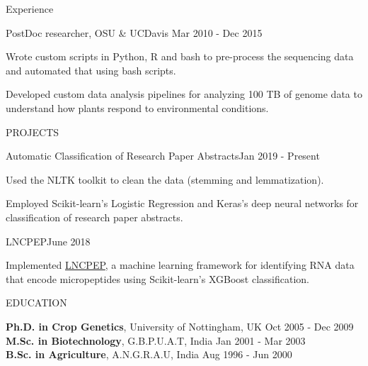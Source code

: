 \documentclass{resume} %
\begin{document}
\begin{rSection}{Experience }
\vspace{-4pt}

\begin{rSubsection}{PostDoc researcher, OSU \& UCDavis }{Mar 2010 - Dec 2015}{}    

\vspace{-3pt}

\item Wrote custom scripts in Python, R and bash to pre-process the sequencing data and automated that using bash scripts.
\item Developed custom data analysis pipelines for analyzing 100 TB of genome data to understand how plants respond to environmental conditions.
\end{rSubsection} 
 
\end{rSection}


\begin{rSection}{PROJECTS}

\begin{rSubsection}{Automatic Classification of Research Paper Abstracts}{Jan 2019 - Present}{} %

\vspace{-3pt}

\item Used the NLTK toolkit to clean the data (stemming and lemmatization). 
\item Employed Scikit-learn's Logistic Regression and Keras's deep neural networks for classification of research paper abstracts. \end{rSubsection} 

\begin{rSubsection}{LNCPEP}{June 2018}{} %

\vspace{-3pt}

\item Implemented \href{https://github.com/NCBI-Hackathons/LNCPEP}{LNCPEP}, a machine learning framework for identifying RNA data that encode micropeptides using Scikit-learn's XGBoost classification. 
\end{rSubsection} 

\end{rSection}



\begin{rSection}{EDUCATION}

{\textbf{Ph.D. in Crop Genetics}, University of Nottingham, UK} \hfill {Oct 2005 - Dec 2009}
\\
{\textbf{M.Sc. in Biotechnology}, G.B.P.U.A.T, India} \hfill {Jan 2001 - Mar 2003}
\\
{\textbf{B.Sc. in Agriculture}, A.N.G.R.A.U, India} \hfill {Aug 1996 - Jun 2000}

\end{rSection} 

\end{document}
